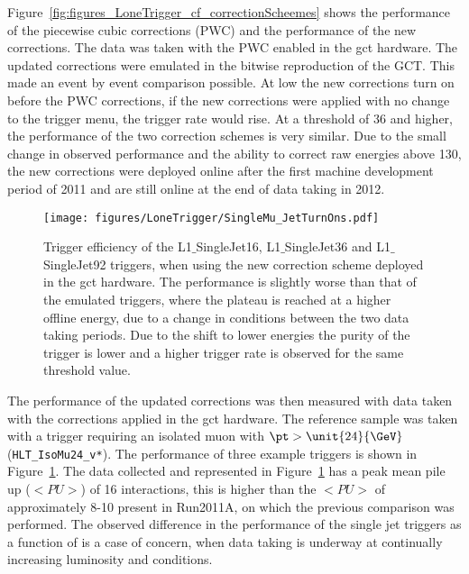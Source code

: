 Figure~\ref{fig:figures_LoneTrigger_cf_correctionScheemes} shows the 
performance of the piecewise cubic corrections (PWC) and the performance of the 
new corrections. The data was taken with the PWC enabled in the \ac{gct} hardware. 
The updated corrections were emulated in the bitwise reproduction of the GCT. 
This made an event by event comparison possible. At low \ET the new corrections 
turn on before the PWC corrections, if the new corrections were applied with 
no change to the trigger menu, the \Lone trigger rate would rise. At a 
threshold of \unit{36}{\GeV} and higher, the performance of the two correction 
schemes is very similar. Due to the small change in observed performance and 
the ability to correct raw energies above \unit{130}{\GeV}, the new corrections 
were deployed online after the first machine development period of 2011 and are 
still online at the end of data taking in 2012.

\begin{figure}[htbp]
  \centering
    \texttt{[image: figures/LoneTrigger/SingleMu\_JetTurnOns.pdf]}
  \caption{Trigger efficiency of the L1$\_$SingleJet16, L1$\_$SingleJet36 and L1$\_$SingleJet92 triggers, when using the new correction scheme deployed in the \ac{gct} hardware. The performance is slightly worse than that of the emulated triggers, where the plateau is reached at a higher offline energy, due to a change in \pu conditions between the two data taking periods. Due to the shift to lower energies the purity of the trigger is lower and a higher trigger rate is observed for the same threshold value.}
  \label{fig:figures_LoneTrigger_SingleMu_JetTurnOns}
\end{figure}

The performance of the updated corrections was then measured with data taken 
with the corrections applied in the \ac{gct} hardware. The reference sample was 
taken with a trigger requiring an isolated muon with $\pt > \unit{24}{\GeV}$  (\verb|HLT_IsoMu24_v*|).
The performance of three example triggers is shown in 
Figure~\ref{fig:figures_LoneTrigger_SingleMu_JetTurnOns}.
The data collected and represented in 
Figure~\ref{fig:figures_LoneTrigger_SingleMu_JetTurnOns} has a peak mean pile 
up ($<PU>$) of 16 interactions, this is higher than the $<PU>$ of approximately 
8-10 present in Run2011A, on which the previous comparison was performed.
The observed difference in the performance of the \Lone single jet triggers as 
a function of \pu is a case of concern, when data taking is underway at 
continually increasing luminosity and \pu conditions.

